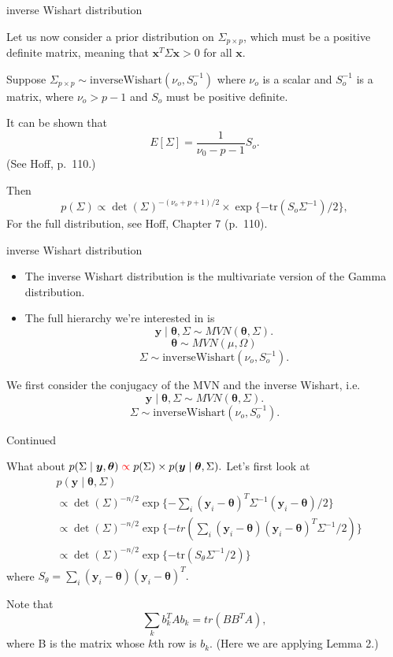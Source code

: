 \documentclass[
  ignorenonframetext,
]{beamer}
\newcommand{\btheta}{{\bm\theta}}
\begin{document}
\begin{frame}{inverse Wishart distribution}
\protect\hypertarget{inverse-wishart-distribution}{}

Let us now consider a prior distribution on \(\Sigma_{p \times p}\),
which must be a positive definite matrix, meaning that
\(\bm{x}^T \Sigma \bm{x} > 0\) for all \(\bm{x}.\)

Suppose
\(\Sigma_{p \times p} \sim \text{inverseWishart}(\nu_o, S_o^{-1})\)
where \(\nu_o\) is a scalar and \(S_o^{-1}\) is a matrix, where
\(\nu_o > p-1\) and \(S_o\) must be positive definite.

It can be shown that \[E[\Sigma] = \frac{1}{\nu_0 - p -1}S_o.\] (See
Hoff, p.~110.)

Then \[p(\Sigma) \propto
\det(\Sigma)^{-(\nu_o + p +1)/2} \times \exp\{
-\text{tr}(S_o\Sigma^{-1})/2
\},\] For the full distribution, see Hoff, Chapter 7 (p.~110).

\end{frame}

\begin{frame}{inverse Wishart distribution}
\protect\hypertarget{inverse-wishart-distribution-1}{}

\begin{itemize}
\item The inverse Wishart distribution is the multivariate version of the Gamma distribution. 
\item The full hierarchy we're interested in is 
$$\bm{y} \mid \btheta, \Sigma \sim MVN(\btheta, \Sigma).$$ 
$$ \btheta \sim MVN(\mu, \Omega)$$
$$ \Sigma \sim \text{inverseWishart}(\nu_o, S_o^{-1}).$$
\end{itemize}

We first consider the conjugacy of the MVN and the inverse Wishart, i.e.
\[\bm{y} \mid \btheta, \Sigma \sim MVN(\btheta, \Sigma).\]
\[ \Sigma \sim \text{inverseWishart}(\nu_o, S_o^{-1}).\]

\end{frame}

\begin{frame}{Continued}
\protect\hypertarget{continued}{}

What about
\(p(\Sigma \mid \bm{y}, \btheta) \; \textcolor{red}{\propto} \; p(\Sigma) \times p(\bm{y} \mid \btheta, \Sigma).\)
Let's first look at \begin{align}
&p(\bm{y} \mid \btheta, \Sigma) \\
&\propto
\det(\Sigma)^{-n/2}\exp\{-
\sum_i (\bm{y}_i - \btheta)^T\Sigma^{-1} (\bm{y}_i - \btheta)/2
\}\\
&\propto
\det(\Sigma)^{-n/2}\exp\{- tr(
\sum_i  (\bm{y}_i - \btheta)(\bm{y}_i - \btheta)^T\Sigma^{-1}/2)
\}\\
&\propto 
\det(\Sigma)^{-n/2}\exp\{-
\text{tr}(S_\theta \Sigma^{-1}/2)
\}
\end{align} where
\(S_\theta = \sum_i (\bm{y}_i - \btheta) (\bm{y}_i - \btheta)^T.\)

Note that \[\sum_k b_k^TA b_k = tr(B B^T A),\] where B is the matrix
whose \(k\)th row is \(b_k.\) (Here we are applying Lemma 2.)

\end{frame}
\end{document}
